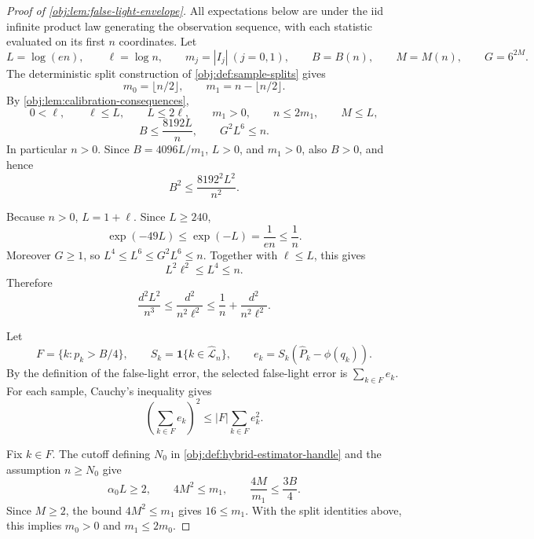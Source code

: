 \begin{proof}[Proof of \cref{obj:lem:false-light-envelope}]
All expectations below are under the iid infinite product law generating the observation sequence, with each statistic evaluated on its first \(n\) coordinates.  Let
\[
L=\log(en),\qquad \ell=\log n,
\qquad m_j=|I_j|\ (j=0,1),
\qquad B=B(n),\qquad M=M(n),
\qquad G=6^{2M}.
\]
The deterministic split construction of \cref{obj:def:sample-splits} gives
\[
m_0=\lfloor n/2\rfloor,
\qquad
m_1=n-\lfloor n/2\rfloor .
\]
By \cref{obj:lem:calibration-consequences},
\[
0<\ell,
\qquad \ell\le L,
\qquad L\le 2\ell,
\qquad m_1>0,
\qquad n\le 2m_1,
\qquad M\le L,
\]
\[
B\le\frac{8192L}{n},
\qquad G^2L^6\le n .
\]
In particular \(n>0\).  Since \(B=4096L/m_1\), \(L>0\), and \(m_1>0\), also \(B>0\), and hence
\[
B^2\le \frac{8192^2L^2}{n^2}.
\]

Because \(n>0\), \(L=1+\ell\).  Since \(L\ge240\),
\[
\exp(-49L)\le \exp(-L)=\frac1{en}\le \frac1n .
\]
Moreover \(G\ge1\), so \(L^4\le L^6\le G^2L^6\le n\).  Together with \(\ell\le L\), this gives
\[
L^2\ell^2\le L^4\le n.
\]
Therefore
\[
\frac{d^2L^2}{n^3}
\le
\frac{d^2}{n^2\ell^2}
\le
\frac1n+\frac{d^2}{n^2\ell^2}.
\]

Let
\[
F=\{k:p_k>B/4\},
\qquad
S_k=\mathbf 1\{k\in\widehat{\mathcal L}_n\},
\qquad
e_k=S_k(\widehat P_k-\phi(q_k)).
\]
By the definition of the false-light error, the selected false-light error is \(\sum_{k\in F}e_k\).  For each sample, Cauchy's inequality gives
\[
\left(\sum_{k\in F}e_k\right)^2
\le
|F|\sum_{k\in F}e_k^2 .
\]

Fix \(k\in F\).  The cutoff defining \(N_0\) in \cref{obj:def:hybrid-estimator-handle} and the assumption \(n\ge N_0\) give
\[
\alpha_0L\ge2,
\qquad
4M^2\le m_1,
\qquad
\frac{4M}{m_1}\le \frac{3B}{4}.
\]
Since \(M\ge2\), the bound \(4M^2\le m_1\) gives \(16\le m_1\).  With the split identities above, this implies \(m_0>0\) and \(m_1\le2m_0\).


\end{proof}
